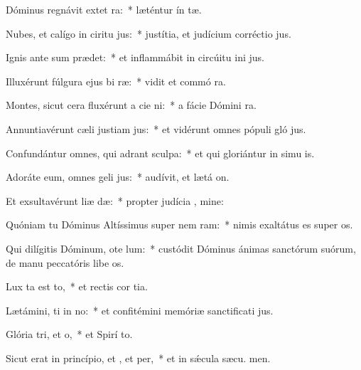\item Dóminus regnávit extet ra:~* læténtur ín tæ.
\item Nubes, et calígo in ciritu jus:~* justítia, et judícium corréctio  jus.
\item Ignis ante sum prædet:~* et inflammábit in circúitu ini jus.
\item Illuxérunt fúlgura ejus bi ræ:~* vidit et commó  ra.
\item Montes, sicut cera fluxérunt a cie ni:~* a fácie Dómini  ra.
\item Annuntiavérunt cæli justiam jus:~* et vidérunt omnes pópuli gló jus.
\item Confundántur omnes, qui adrant sculpa:~* et qui gloriántur in simu is.
\item Adoráte eum, omnes geli jus:~* audívit, et lætá  on.
\item Et exsultavérunt liæ dæ:~* propter judícia , mine:
\item Quóniam tu Dóminus Altíssimus super nem ram:~* nimis exaltátus es super  os.
\item Qui dilígitis Dóminum, ote lum:~* custódit Dóminus ánimas sanctórum suórum, de manu peccatóris libe os.
\item Lux ta est to,~* et rectis cor tia.
\item Lætámini, ti in no:~* et confitémini memóriæ sanctificati jus.
\item Glória tri, et o,~* et Spirí to.
\item Sicut erat in princípio, et , et per,~* et in sǽcula sæcu. men.
